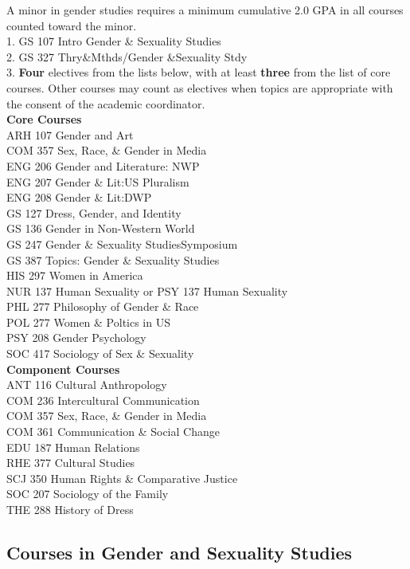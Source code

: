 \documentclass[
  letterpaper,
]{scrbook}
\begin{document}
A minor in gender studies requires a minimum cumulative 2.0 GPA in all
courses counted toward the minor.\\
1. GS 107 Intro Gender \& Sexuality Studies\\
2. GS 327 Thry\&Mthds/Gender \&Sexuality Stdy\\
3. \textbf{Four} electives from the lists below, with at least
\textbf{three} from the list of core courses. Other courses may count as
electives when topics are appropriate with the consent of the academic
coordinator.\\
\textbf{Core Courses}\\
ARH 107 Gender and Art\\
COM 357 Sex, Race, \& Gender in Media\\
ENG 206 Gender and Literature: NWP\\
ENG 207 Gender \& Lit:US Pluralism\\
ENG 208 Gender \& Lit:DWP\\
GS 127 Dress, Gender, and Identity\\
GS 136 Gender in Non-Western World\\
GS 247 Gender \& Sexuality StudiesSymposium\\
GS 387 Topics: Gender \& Sexuality Studies\\
HIS 297 Women in America\\
NUR 137 Human Sexuality or PSY 137 Human Sexuality\\
PHL 277 Philosophy of Gender \& Race\\
POL 277 Women \& Poltics in US\\
PSY 208 Gender Psychology\\
SOC 417 Sociology of Sex \& Sexuality\\
\textbf{Component Courses}\\
ANT 116 Cultural Anthropology\\
COM 236 Intercultural Communication\\
COM 357 Sex, Race, \& Gender in Media\\
COM 361 Communication \& Social Change\\
EDU 187 Human Relations\\
RHE 377 Cultural Studies\\
SCJ 350 Human Rights \& Comparative Justice\\
SOC 207 Sociology of the Family\\
THE 288 History of Dress

\subsection{Courses in Gender and Sexuality
Studies}\label{courses-in-gender-and-sexuality-studies}
\end{document}
